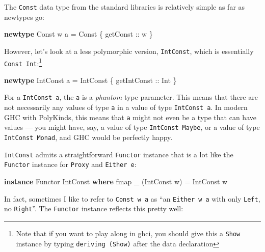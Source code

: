 \documentclass[]{article}
\newenvironment{Shaded}{}{}
\newcommand{\DataTypeTok}[1]{\textcolor[rgb]{0.56,0.13,0.00}{#1}}
\newcommand{\FunctionTok}[1]{\textcolor[rgb]{0.02,0.16,0.49}{#1}}
\newcommand{\KeywordTok}[1]{\textcolor[rgb]{0.00,0.44,0.13}{\textbf{#1}}}
\newcommand{\NormalTok}[1]{#1}
\newcommand{\OtherTok}[1]{\textcolor[rgb]{0.00,0.44,0.13}{#1}}
\begin{document}
The \texttt{Const} data type from the standard libraries is relatively simple as
far as newtypes go:

\begin{Shaded}
\begin{Highlighting}[]
\KeywordTok{newtype} \DataTypeTok{Const}\NormalTok{ w a }\OtherTok{=} \DataTypeTok{Const}\NormalTok{ \{}\OtherTok{ getConst ::}\NormalTok{ w \}}
\end{Highlighting}
\end{Shaded}

However, let's look at a less polymorphic version, \texttt{IntConst}, which is
essentially \texttt{Const\ Int}:\footnote{Note that if you want to play along in
  ghci, you should give this a \texttt{Show} instance by typing
  \texttt{deriving\ (Show)} after the data declaration}

\begin{Shaded}
\begin{Highlighting}[]
\KeywordTok{newtype} \DataTypeTok{IntConst}\NormalTok{ a }\OtherTok{=} \DataTypeTok{IntConst}\NormalTok{ \{}\OtherTok{ getIntConst ::} \DataTypeTok{Int}\NormalTok{ \}}
\end{Highlighting}
\end{Shaded}

For a \texttt{IntConst\ a}, the \texttt{a} is a \emph{phantom} type parameter.
This means that there are not necessarily any values of type \texttt{a} in a
value of type \texttt{IntConst\ a}. In modern GHC with PolyKinds, this means
that \texttt{a} might not even be a type that can have values --- you might
have, say, a value of type \texttt{IntConst\ Maybe}, or a value of type
\texttt{IntConst\ Monad}, and GHC would be perfectly happy.

\texttt{IntConst} admits a straightforward \texttt{Functor} instance that is a
lot like the \texttt{Functor} instance for \texttt{Proxy} and
\texttt{Either\ e}:

\begin{Shaded}
\begin{Highlighting}[]
\KeywordTok{instance} \DataTypeTok{Functor} \DataTypeTok{IntConst} \KeywordTok{where}
    \FunctionTok{fmap}\NormalTok{ \_ (}\DataTypeTok{IntConst}\NormalTok{ w) }\OtherTok{=} \DataTypeTok{IntConst}\NormalTok{ w}
\end{Highlighting}
\end{Shaded}

In fact, sometimes I like to refer to \texttt{Const\ w\ a} as ``an
\texttt{Either\ w\ a} with only \texttt{Left}, no \texttt{Right}''. The
\texttt{Functor} instance reflects this pretty well:
\end{document}
